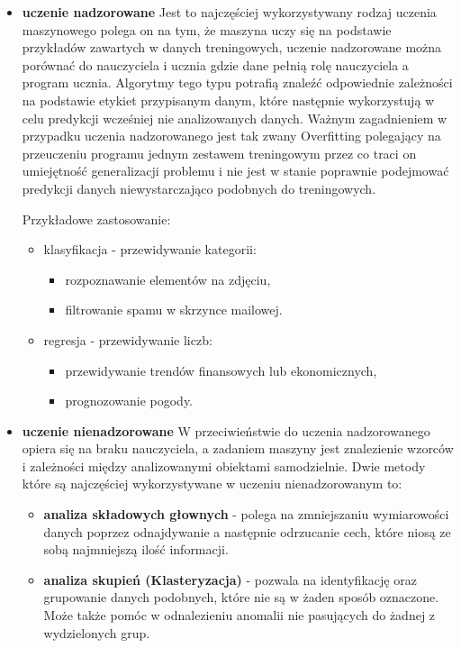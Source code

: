 \begin{itemize}
    \item \textbf{uczenie nadzorowane}
    Jest to najczęściej wykorzystywany rodzaj uczenia maszynowego polega on na tym,
    że maszyna uczy się na podstawie przykładów zawartych w danych treningowych,
    uczenie nadzorowane można porównać do nauczyciela i ucznia gdzie dane pełnią rolę nauczyciela 
    a program ucznia. Algorytmy tego typu potrafią znaleźć odpowiednie zależności na podstawie
    etykiet przypisanym danym,
    które następnie wykorzystują w celu predykcji wcześniej nie analizowanych danych.
    Ważnym zagadnieniem w przypadku uczenia nadzorowanego jest tak zwany Overfitting polegający 
    na przeuczeniu programu jednym zestawem treningowym przez co traci on umiejętność generalizacji problemu
    i nie jest w stanie poprawnie podejmować predykcji danych niewystarczająco podobnych
    do treningowych.

    Przykładowe zastosowanie:
    \begin{itemize}
        \item klasyfikacja - przewidywanie kategorii:
        \begin{itemize}
            \item rozpoznawanie elementów na zdjęciu,
            \item filtrowanie spamu w skrzynce mailowej.
        \end{itemize}
        \item regresja - przewidywanie liczb:
        \begin{itemize}
            \item przewidywanie trendów finansowych lub ekonomicznych,
            \item prognozowanie pogody.
        \end{itemize}
    \end{itemize}
    \item \textbf{uczenie nienadzorowane}
    W przeciwieństwie do uczenia nadzorowanego opiera się na braku
    nauczyciela, a zadaniem maszyny jest znalezienie wzorców i zależności między analizowanymi
    obiektami samodzielnie. Dwie metody które są najczęściej wykorzystywane w uczeniu nienadzorowanym
    to:
    \begin{itemize}
        \item \textbf{analiza składowych głownych} - polega na zmniejszaniu wymiarowości danych poprzez
        odnajdywanie a następnie odrzucanie cech, które niosą ze sobą najmniejszą ilość informacji.
        \item \textbf{analiza skupień (Klasteryzacja)} - pozwala na identyfikację oraz grupowanie danych
        podobnych, które nie są w żaden sposób oznaczone. Może także pomóc w odnalezieniu anomalii
        nie pasujących do żadnej z wydzielonych grup.
        

\end{itemize}
\end{itemize}
